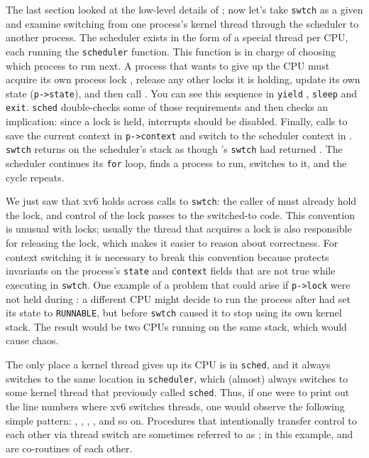 The last section looked at the low-level details of
;
now let's take 
\lstinline{swtch}
as a given and examine 
switching from one process's kernel thread
through the scheduler to another process.
The scheduler exists in the form of a special thread per CPU, each running the
\lstinline{scheduler}
function.
This function is in charge of choosing which process to run next.
A process
that wants to give up the CPU must
acquire its own process lock
,
release any other locks it is holding,
update its own state
(\lstinline{p->state}),
and then call
.
You can see this sequence in
\lstinline{yield}
,
\texttt{sleep}
and
\texttt{exit}.
\lstinline{sched}
double-checks some of those requirements
and then checks an implication:
since a lock is held, interrupts should be disabled.
Finally,
calls
to save the current context in 
\lstinline{p->context}
and switch to the scheduler context in
.
\lstinline{swtch}
returns on the scheduler's stack
as though
's
\lstinline{swtch}
had returned
.
The scheduler continues its
\lstinline{for}
loop, finds a process to run, 
switches to it, and the cycle repeats.

We just saw that xv6 holds
across calls to
\lstinline{swtch}:
the caller of
must already hold the lock, and control of the lock passes to the
switched-to code.  This convention is unusual with locks; usually
the thread that acquires a lock is also responsible for
releasing the lock, which makes it easier to reason about correctness.
For context switching it is necessary to break this convention because
protects invariants on the process's
\lstinline{state}
and
\lstinline{context}
fields that are not true while executing in
\lstinline{swtch}.
One example of a problem that could arise if
\lstinline{p->lock}
were not held during
:
a different CPU might decide
to run the process after 
had set its state to
\lstinline{RUNNABLE},
but before 
\lstinline{swtch}
caused it to stop using its own kernel stack.
The result would be two CPUs running on the same stack,
which would cause chaos.

The only place a kernel thread gives up its CPU is in
\lstinline{sched},
and it always switches to the same location in \lstinline{scheduler}, which
(almost) always switches to some kernel thread that previously called
\lstinline{sched}. 
Thus, if one were to print out the line numbers where xv6 switches
threads, one would observe the following simple pattern:
,
,
,
,
and so on.
Procedures that intentionally transfer control to each other via thread
switch are sometimes referred to as
; 
in this example,
and
are co-routines of each other.

